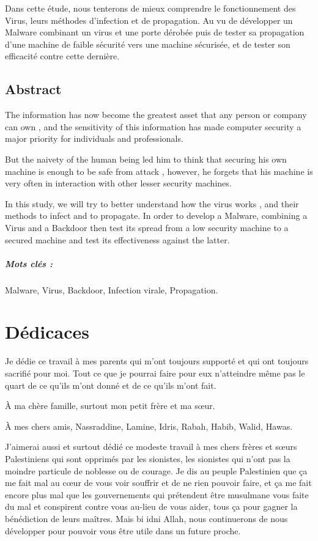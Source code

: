 Dans cette étude, nous tenterons de mieux comprendre le fonctionnement des Virus, leurs méthodes d'infection et de propagation. Au vu de développer un Malware combinant un virus et une porte dérobée puis de tester sa propagation d'une machine de faible sécurité vers une machine sécurisée, et de tester son efficacité contre cette dernière. %

\section*{Abstract}
The information has now become the greatest asset that any person or company can own , and the sensitivity of this information has made computer security a major priority for individuals and professionals.

But the naivety of the human being led him to think that securing his own machine is  enough to be safe from attack , however, he forgets that his machine is very often in interaction with other lesser security machines.

In this study, we will try to better understand how the virus works , and their methods to infect and to propagate. In order to develop a Malware, combining a Virus and a Backdoor then test its spread from a low security machine to a secured machine and test its effectiveness against the latter. %

\paragraph{Mots clés :} Malware, Virus, Backdoor, Infection virale, Propagation.






\chapter*{Dédicaces}
Je dédie ce travail à mes parents qui m'ont toujours supporté et qui ont toujours sacrifié pour moi. Tout ce que
je pourrai faire pour eux n'atteindre même pas le quart de ce qu'ils m'ont donné et de ce qu'ils m'ont fait.

À ma chère famille, surtout mon petit frère et ma sœur.

À mes chers amis, Nassraddine, Lamine, Idris, Rabah, Habib, Walid, Hawas.

J'aimerai aussi et surtout dédié ce modeste travail à mes chers frères et sœurs Palestiniens qui sont opprimés par les
sionistes, les sionistes qui n'ont pas la moindre particule de noblesse ou de courage. Je dis au peuple Palestinien
que ça me fait mal au cœur de vous voir souffrir et de ne rien pouvoir faire, et ça me fait encore plus mal que 
les gouvernements qui prétendent être musulmane vous faite du mal et conspirent contre vous au-lieu de vous aider, tous 
ça pour gagner la bénédiction de leurs maîtres. 
Mais bi idni Allah, nous continuerons de nous développer pour pouvoir vous être utile dans un future proche.

